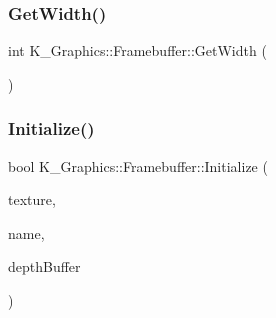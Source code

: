 \subsubsection{\texorpdfstring{Get\+Width()}{GetWidth()}}
{\footnotesize\ttfamily int K\+\_\+\+Graphics\+::\+Framebuffer\+::\+Get\+Width (\begin{DoxyParamCaption}{ }\end{DoxyParamCaption})}

\mbox{\label{class_k___graphics_1_1_framebuffer_a109152dd1cce45054686bcb1f6576528}} 
\subsubsection{\texorpdfstring{Initialize()}{Initialize()}}
{\footnotesize\ttfamily bool K\+\_\+\+Graphics\+::\+Framebuffer\+::\+Initialize (\begin{DoxyParamCaption}\item[{\mbox{\hyperlink{class_k___graphics_1_1_texture}{Texture}} $\ast$}]{texture,  }\item[{const std\+::string \&}]{name,  }\item[{G\+Luint}]{depth\+Buffer }\end{DoxyParamCaption})}

